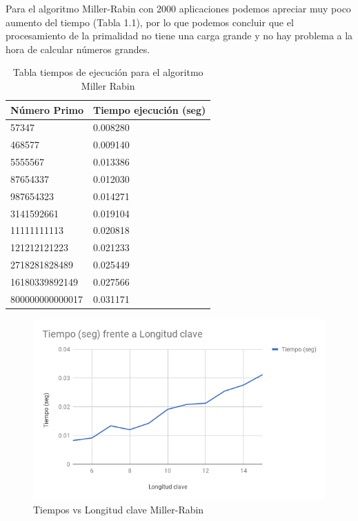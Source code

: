 Para el algoritmo Miller-Rabin con 2000 aplicaciones podemos apreciar muy poco aumento del tiempo (Tabla 1.1), por lo que podemos concluir que el procesamiento de la primalidad no tiene una carga grande y no hay problema a la hora de calcular números grandes.
\begin{table}[htbp]
	\begin{center}
		\begin{tabular}{|l|l|}
			\hline
			\rowcolor{LightCyan}
			Número Primo & Tiempo ejecución (seg) \\ \hline
			57347&  0.008280 \\ \hline 
			468577&  0.009140 \\ \hline 
			5555567&  0.013386 \\ \hline 
			87654337&  0.012030 \\ \hline 
			987654323&  0.014271 \\ \hline 
			3141592661&  0.019104 \\ \hline 
			11111111113&  0.020818 \\ \hline 
			121212121223&  0.021233 \\ \hline 
			2718281828489&  0.025449 \\ \hline 
			16180339892149&  0.027566 \\ \hline 
			800000000000017&  0.031171 \\ \hline 
		\end{tabular}
		\caption{Tabla tiempos de ejecución para el algoritmo Miller Rabin}
		\label{tabla:millerrabin}
	\end{center}
\end{table}

\begin{figure}[H]
	\begin{center}
		\includegraphics[width=1\linewidth]{chart2}
		\caption{Tiempos vs Longitud clave Miller-Rabin}
		\label{figura: tiempos3}
	\end{center}
\end{figure}

